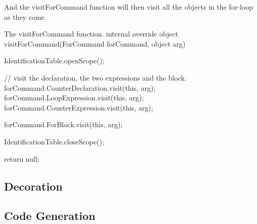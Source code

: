 And the visitForCommand function will then visit all the objects in the for-loop as they come.
\newline
\begin{source}{The visitForCommand function.}{}
internal override object visitForCommand(ForCommand forCommand, object arg)
		{
				IdentificationTable.openScope();

        // visit the declaration, the two expressions and the block.
        forCommand.CounterDeclaration.visit(this, arg);
        forCommand.LoopExpression.visit(this, arg);
        forCommand.CounterExpression.visit(this, arg);

        forCommand.ForBlock.visit(this, arg);

        IdentificationTable.closeScope();
						
        return null;
    }
\end{source}

\subsection{Decoration}


\subsection{Code Generation}
